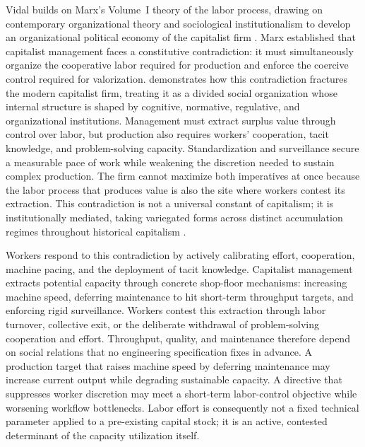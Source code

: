 Vidal builds on Marx's Volume~I theory of the labor process, drawing on contemporary organizational theory and sociological institutionalism to develop an organizational political economy of the capitalist firm \citep{VidalPeck2012, Vidal2022}. Marx established that
capitalist management faces a constitutive contradiction: it
must simultaneously organize the cooperative labor required for
production and enforce the coercive control required for
valorization. \citet{Vidal2022} demonstrates how this contradiction fractures
the modern capitalist firm, treating it as a divided social
organization whose internal structure is shaped by cognitive,
normative, regulative, and organizational institutions. Management must extract surplus value through
control over labor, but production also requires workers'
cooperation, tacit knowledge, and problem-solving capacity.
Standardization and surveillance secure a measurable pace of
work while weakening the discretion needed to sustain complex
production. The firm cannot maximize both imperatives at once
because the labor process that produces value is also the site
where workers contest its extraction. This contradiction is not
a universal constant of capitalism; it is institutionally
mediated, taking variegated forms across distinct accumulation regimes throughout historical capitalism
\citep{Vidal2019}.

Workers respond to this contradiction by actively calibrating
effort, cooperation, machine pacing, and the deployment of tacit
knowledge. Capitalist management extracts potential capacity
through concrete shop-floor mechanisms: increasing machine speed,
deferring maintenance to hit short-term throughput targets, and
enforcing rigid surveillance. Workers contest this extraction
through labor turnover, collective exit, or the deliberate
withdrawal of problem-solving cooperation and effort. Throughput,
quality, and maintenance therefore depend on social relations
that no engineering specification fixes in advance. A production
target that raises machine speed by deferring maintenance may
increase current output while degrading sustainable capacity. A
directive that suppresses worker discretion may meet a
short-term labor-control objective while worsening workflow
bottlenecks. Labor effort is consequently not a fixed technical
parameter applied to a pre-existing capital stock; it is an
active, contested determinant of the capacity utilization itself.

